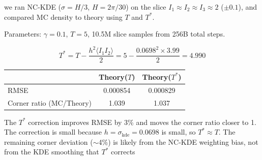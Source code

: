 \documentclass[12pt]{article}
\begin{document}
we ran NC-KDE ($\sigma = H/3$, $H = 2\pi/30$) on the slice $I_1 \approx I_2 \approx I_3 \approx 2$ ($\pm 0.1$), and compared MC density to theory using $T$ and $T^*$.

Parameters: $\gamma = 0.1$, $T = 5$, 10.5M slice samples from 256B total steps.

$$T^* = T - \frac{h^2 \langle I_1 I_2\rangle}{2} = 5 - \frac{0.0698^2 \times 3.99}{2} = 4.990$$

\begin{center}
\begin{tabular}{lcc}
\toprule
& Theory($T$) & Theory($T^*$) \\
\midrule
RMSE & 0.000854 & 0.000829 \\
Corner ratio (MC/Theory) & 1.039 & 1.037 \\
\bottomrule
\end{tabular}
\end{center}

The $T^*$ correction improves RMSE by 3\% and moves the corner ratio closer to 1. The correction is small because $h = \sigma_{\text{kde}} = 0.0698$ is small, so $T^* \approx T$. The remaining corner deviation ($\sim$4\%) is likely from the NC-KDE weighting bias, not from the KDE smoothing that $T^*$ corrects
\end{document}
